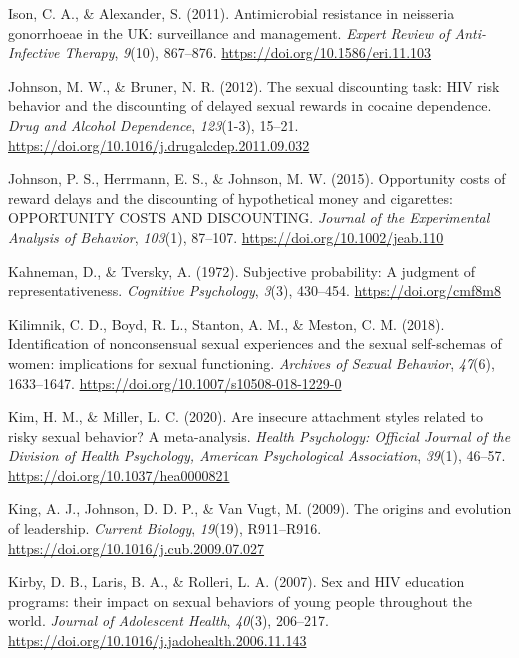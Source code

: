 \documentclass[
  donotrepeattitle,doc, 12pt, a4paper,floatsintext]{apa7}
\newlength{\cslhangindent}
\newlength{\cslentryspacingunit} %
\newenvironment{CSLReferences}[2] %
 {%
  \setlength{\parindent}{0pt}
  \ifodd #1
  \let\oldpar\par
  \def\par{\hangindent=\cslhangindent\oldpar}
  \fi
  \setlength{\parskip}{#2\cslentryspacingunit}
 }%
 {}
\begin{document}
\begin{CSLReferences}{1}{0}
\leavevmode{}%
Ison, C. A., \& Alexander, S. (2011). Antimicrobial resistance in neisseria gonorrhoeae in the UK: surveillance and management. \emph{Expert Review of Anti-Infective Therapy}, \emph{9}(10), 867--876. \url{https://doi.org/10.1586/eri.11.103}

\leavevmode{}%
Johnson, M. W., \& Bruner, N. R. (2012). The sexual discounting task: HIV risk behavior and the discounting of delayed sexual rewards in cocaine dependence. \emph{Drug and Alcohol Dependence}, \emph{123}(1-3), 15--21. \url{https://doi.org/10.1016/j.drugalcdep.2011.09.032}

\leavevmode{}%
Johnson, P. S., Herrmann, E. S., \& Johnson, M. W. (2015). Opportunity costs of reward delays and the discounting of hypothetical money and cigarettes: OPPORTUNITY COSTS AND DISCOUNTING. \emph{Journal of the Experimental Analysis of Behavior}, \emph{103}(1), 87--107. \url{https://doi.org/10.1002/jeab.110}

\leavevmode{}%
Kahneman, D., \& Tversky, A. (1972). Subjective probability: A judgment of representativeness. \emph{Cognitive Psychology}, \emph{3}(3), 430--454. \url{https://doi.org/cmf8m8}

\leavevmode{}%
Kilimnik, C. D., Boyd, R. L., Stanton, A. M., \& Meston, C. M. (2018). Identification of nonconsensual sexual experiences and the sexual self-schemas of women: implications for sexual functioning. \emph{Archives of Sexual Behavior}, \emph{47}(6), 1633--1647. \url{https://doi.org/10.1007/s10508-018-1229-0}

\leavevmode{}%
Kim, H. M., \& Miller, L. C. (2020). Are insecure attachment styles related to risky sexual behavior? A meta-analysis. \emph{Health Psychology: Official Journal of the Division of Health Psychology, American Psychological Association}, \emph{39}(1), 46--57. \url{https://doi.org/10.1037/hea0000821}

\leavevmode{}%
King, A. J., Johnson, D. D. P., \& Van Vugt, M. (2009). The origins and evolution of leadership. \emph{Current Biology}, \emph{19}(19), R911--R916. \url{https://doi.org/10.1016/j.cub.2009.07.027}

\leavevmode{}%
Kirby, D. B., Laris, B. A., \& Rolleri, L. A. (2007). Sex and HIV education programs: their impact on sexual behaviors of young people throughout the world. \emph{Journal of Adolescent Health}, \emph{40}(3), 206--217. \url{https://doi.org/10.1016/j.jadohealth.2006.11.143}


\end{CSLReferences}
\end{document}
